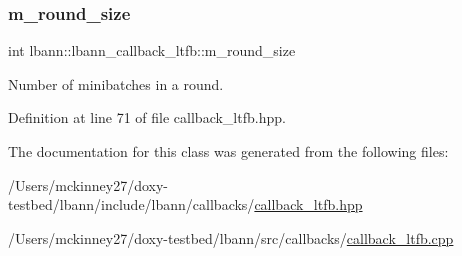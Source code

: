 \subsubsection{\texorpdfstring{m\+\_\+round\+\_\+size}{m\_round\_size}}
{\footnotesize\ttfamily int lbann\+::lbann\+\_\+callback\+\_\+ltfb\+::m\+\_\+round\+\_\+size\hspace{0.3cm}{\ttfamily [private]}}

Number of minibatches in a round. 

Definition at line 71 of file callback\+\_\+ltfb.\+hpp.



The documentation for this class was generated from the following files\+:\begin{DoxyCompactItemize}
\item 
/\+Users/mckinney27/doxy-\/testbed/lbann/include/lbann/callbacks/\hyperlink{callback__ltfb_8hpp}{callback\+\_\+ltfb.\+hpp}\item 
/\+Users/mckinney27/doxy-\/testbed/lbann/src/callbacks/\hyperlink{callback__ltfb_8cpp}{callback\+\_\+ltfb.\+cpp}\end{DoxyCompactItemize}
